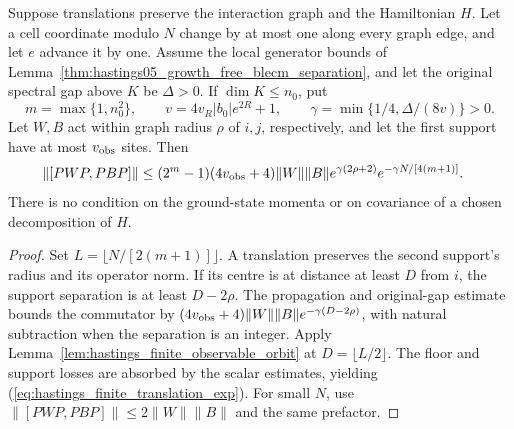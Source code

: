 \begin{lemma}
    \label{thm:hastings_finite_translation_exp}
    \leanok
    Suppose translations preserve the interaction graph and the
    Hamiltonian $H$. Let a cell coordinate modulo $N$ change by at
    most one along every graph edge, and let $e$ advance it by one.
    Assume the local generator bounds of
    Lemma~\ref{thm:hastings05_growth_free_blecm_separation}, and let
    the original spectral gap above $K$ be $\Delta>0$.
    If $\dim K\le n_0$, put
    \[
        m=\max\{1,n_0^2\},\qquad
        v=4v_R|b_0|e^{2R}+1,\qquad
        \gamma=\min\{1/4,\Delta/(8v)\}>0.
    \]
    Let $W,B$ act within graph radius $\rho$ of $i,j$, respectively,
    and let the first support have at most $v_{\rm obs}$ sites. Then
    \begin{align}
        \|[PWP,PBP]\|
         & \le (2^m-1)(4v_{\rm obs}+4)\|W\|\|B\|
        e^{\gamma(2\rho+2)}e^{-\gamma N/[4(m+1)]}.
        \label{eq:hastings_finite_translation_exp}
    \end{align}
    There is no condition on the ground-state momenta or on covariance
    of a chosen decomposition of $H$.
\end{lemma}
\begin{proof}\leanok
    Set $L=\lfloor N/[2(m+1)]\rfloor$. A translation preserves the
    second support's radius and its operator norm. If its centre is
    at distance at least $D$ from $i$, the support separation is at
    least $D-2\rho$. The propagation and original-gap estimate bounds
    the commutator by
    $(4v_{\rm obs}+4)\|W\|\|B\|e^{-\gamma(D-2\rho)}$, with natural
    subtraction when the separation is an integer. Apply
    Lemma~\ref{lem:hastings_finite_observable_orbit} at $D=\lfloor L/2\rfloor$. The floor and support
    losses are absorbed by the scalar estimates, yielding
    (\ref{eq:hastings_finite_translation_exp}). For small $N$, use
    $\|[PWP,PBP]\|\le2\|W\|\|B\|$ and the same prefactor.
\end{proof}


